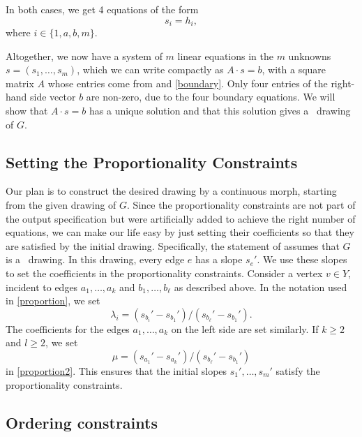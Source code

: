 In both cases, we get 4 equations of the form
\begin{equation}
  \label{eq:boundary}
  s_i = h_i, %
\end{equation}
where $i\in\{1,a,b,m\}$.


Altogether, we now have a system of $m$ linear equations
in the $m$ unknowns $s=(s_1,\ldots,s_m)$, which we can write
compactly as
$A\cdot s = b$, with a square matrix $A$ whose entries come from
\thetag{\ref{eq:slope0}--\ref{eq:proportion2}}
and \eqref{boundary}.
Only four entries of
the right-hand side vector
$b$
are non-zero, due to the four boundary equations.
We will show that $A\cdot s=b$ has a unique
solution and that this solution gives a \Fary\ drawing of $G$.

\subsection{Setting the Proportionality Constraints}
\label{sec:setting}


Our plan is to construct the desired drawing by a continuous morph, 
starting from the given drawing of $G$. Since the proportionality 
constraints are not part of the output specification but were 
artificially added to achieve the right number of equations, we can make 
our life easy by just setting their coefficients so that they are 
satisfied by the initial drawing.
Specifically, the statement of  assumes that $G$ is a
\Fary\ drawing.  In this drawing, every edge $e$
has a slope $s_e'$.
We use these slopes to set the
coefficients in the proportionality constraints.
Consider a
vertex $v\in Y$, incident to edges $a_1,\ldots,a_k$ and $b_1,\ldots,b_\ell$
as described above.
In the notation used
in \eqref{proportion}, we set
\[
\lambda_i = (s_{b_i}'-s_{b_1}')/(s_{b_\ell}'-s_{b_1}') .
\]
The coefficients for the edges
 $a_1,\ldots,a_k$ on the left side are set similarly.
If $k\ge2$ and $l\ge 2$,
we set
\[
\mu = (s_{a_1}'-s_{a_k}')/(s_{b_\ell}'-s_{b_1}')
\]
 in \eqref{proportion2}.
This ensures that the initial slopes $s_{1}',\ldots,s_{m}'$ satisfy the
proportionality constraints.


\subsection{Ordering constraints}

